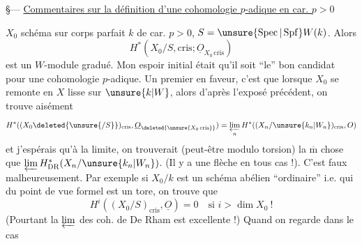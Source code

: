 \S--- \uline{Commentaires sur la définition d'une cohomologie $p$-adique en car. $p>0$}

$X_0$ schéma sur corps parfait $k$ de car. $p>0$, $S=\unsure{\operatorname{Spec}|\operatorname{Spf}}W(k)$. Alors
\[
H^*(X_0/S,\mathrm{cris};\underline O_{X_0\,\mathrm{cris}})
\]
est un $W$-module gradué.  Mon espoir initial était qu'il soit  ``le'' bon candidat pour une cohomologie $p$-adique. Un premier   en faveur, c'est que lorsque $X_0$  se remonte en $X$  lisse sur $\unsure{k|W}$, alors d'après l'exposé précédent, on trouve aisément
\[
H^*((X_0\deleted{\unsure{/S}})_{\mathrm{cris}},\underline O_{\deleted{\unsure{X_0\,\mathrm{cris}}}})
=\varprojlim_n H^*((X_n/\unsure{k_n|W_n})_{\mathrm{cris}},O)
\]
et j'espérais qu'à la limite, on trouverait (peut-être modulo torsion) la $\overline{\mathrm m}$ chose que $\varprojlim H^*_{\mathrm{DR}}(X_n/\unsure{k_n|W_n})$.
(Il y  a une flèche en tous cas !).
C'est faux malheureusement. Par exemple si $X_0/k$ est un schéma abélien ``ordinaire'' i.e. qui du point de vue formel est un tore, on trouve que
\[
H^i((X_0/S)_{\mathrm{cris}},\underline O)=0\quad\text{si }i>\dim X_0\ !
\]
(Pourtant la $\varprojlim$ des coh. de De Rham est excellente !)
 Quand on regarde dans le cas
